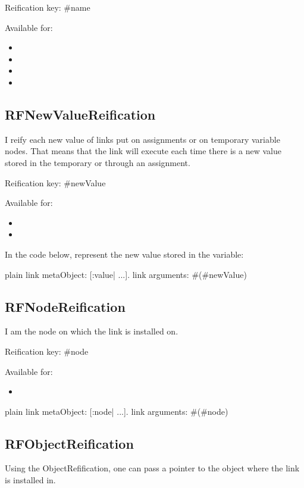 \documentclass[10pt,twoside,english]{_support/latex/sbabook/sbabook}
\begin{document}
Reification key: \#name

Available for:

\begin{itemize}
\item {}
\item {}
\item {}
\item {}
\end{itemize}
\subsection{RFNewValueReification}
I reify each new value of links put on assignments or on temporary variable nodes. That means that the link will execute each time there is a new value stored in the temporary or through an assignment.

Reification key: \#newValue

Available for:

\begin{itemize}
\item {}
\item {}
\end{itemize}

In the code below,  represent the new value stored in the variable:

\begin{displaycode}{plain}
link metaObject: [:value| ...].
link arguments: #(#newValue)
\end{displaycode}
\subsection{RFNodeReification}
I am the node on which the link is installed on.

Reification key: \#node

Available for:

\begin{itemize}
\item {}
\end{itemize}

\begin{displaycode}{plain}
link metaObject: [:node| ...].
link arguments: #(#node)
\end{displaycode}
\subsection{RFObjectReification}
Using the ObjectRefification, one can pass a pointer to the object where the link is installed in.
\end{document}
